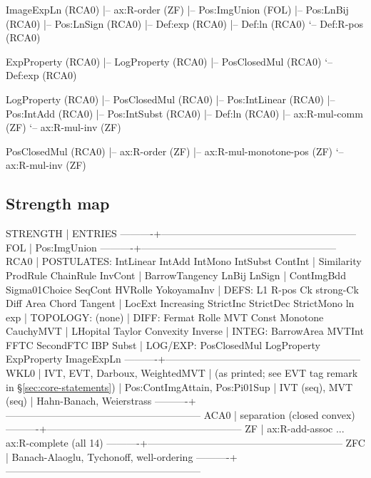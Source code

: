 \documentclass[11pt,reqno]{amsart}
\theoremstyle{redplain}
\begin{document}
\begin{verbatimbox}
	ImageExpLn                        (RCA0)
	|-- ax:R-order                    (ZF)
	|-- Pos:ImgUnion                  (FOL)
	|-- Pos:LnBij                     (RCA0)
	|-- Pos:LnSign                    (RCA0)
	|-- Def:exp                       (RCA0)
	|-- Def:ln                        (RCA0)
	`-- Def:R-pos                     (RCA0)
	
	ExpProperty                       (RCA0)
	|-- LogProperty                   (RCA0)
	|-- PosClosedMul                  (RCA0)
	`-- Def:exp                       (RCA0)
	
	LogProperty                       (RCA0)
	|-- PosClosedMul                  (RCA0)
	|-- Pos:IntLinear                 (RCA0)
	|-- Pos:IntAdd                    (RCA0)
	|-- Pos:IntSubst                  (RCA0)
	|-- Def:ln                        (RCA0)
	|-- ax:R-mul-comm                 (ZF)
	`-- ax:R-mul-inv                  (ZF)
	
	PosClosedMul                      (RCA0)
	|-- ax:R-order                    (ZF)
	|-- ax:R-mul-monotone-pos         (ZF)
	`-- ax:R-mul-inv                  (ZF)
\end{verbatimbox}

\subsection{Strength map}

\begin{verbatimbox}
	STRENGTH  |  ENTRIES
	----------+-----------------------------------------------------------
	FOL       |  Pos:ImgUnion
	----------+-----------------------------------------------------------
		RCA0      |  POSTULATES: IntLinear IntAdd IntMono IntSubst ContInt
	|              Similarity ProdRule ChainRule InvCont
	|              BarrowTangency LnBij LnSign
	|              ContImgBdd Sigma01Choice SeqCont HVRolle YokoyamaInv
	|  DEFS: L1 R-pos Ck strong-Ck Diff Area Chord Tangent
	|        LocExt Increasing StrictInc StrictDec StrictMono ln exp
	|  TOPOLOGY:  (none)
	|  DIFF: Fermat Rolle MVT Const Monotone CauchyMVT
	|        LHopital Taylor Convexity Inverse
	|  INTEG: BarrowArea MVTInt FFTC SecondFTC IBP Subst
	|  LOG/EXP: PosClosedMul LogProperty ExpProperty ImageExpLn
	----------+-----------------------------------------------------------
	WKL0      |  IVT, EVT, Darboux, WeightedMVT
	|  (as printed; see EVT tag remark in \S\ref{sec:core-statements})
	|  Pos:ContImgAttain, Pos:Pi01Sup
	|  IVT (seq), MVT (seq)
	|  Hahn-Banach, Weierstrass
	----------+-----------------------------------------------------------
	ACA0      |  separation (closed convex)
	----------+-----------------------------------------------------------
	ZF        |  ax:R-add-assoc ... ax:R-complete (all 14)
	----------+-----------------------------------------------------------
	ZFC       |  Banach-Alaoglu, Tychonoff, well-ordering
	----------+-----------------------------------------------------------
\end{verbatimbox}
\end{document}
